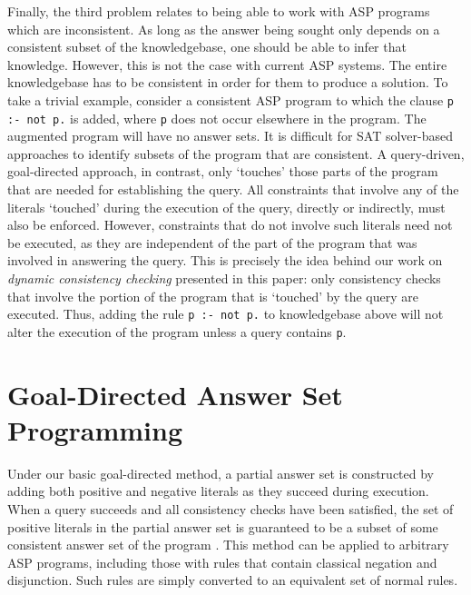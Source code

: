 \documentclass{new_tlp}
\begin{document}
Finally, the third problem relates to being able to work with ASP programs 
which are inconsistent. As long as the answer being sought only 
depends on a consistent subset of the knowledgebase, one should be able to 
infer that knowledge. However, this is not the case with current ASP systems. 
The entire knowledgebase has to be consistent in order for them to produce a 
solution. To take a trivial example, consider a consistent ASP program 
 to which the clause {\tt p :- not p.} 
is added, where {\tt p} does not occur elsewhere in the program. The augmented 
program will have no answer sets. It is difficult for 
SAT solver-based approaches to identify subsets of the program that are 
consistent. A query-driven, goal-directed approach, in contrast, only `touches'
those parts of the program that are needed for establishing the query. All
constraints that involve any of the literals `touched' during the execution of 
the query, directly or indirectly, must also be enforced. However, constraints 
that do not involve such literals need not be executed, as they are independent
of the part of the program that was involved in answering the query. This is
precisely the idea behind our work on {\it dynamic consistency checking}
presented in this paper: only consistency checks that involve the portion of
the program that is `touched' by the query are executed. Thus, adding the rule
{\tt p :- not p.} to knowledgebase  above will not alter the execution
of the program unless a query contains \texttt{p}.


\section{Goal-Directed Answer Set Programming} \label{sec:goaldir}

Under our basic goal-directed method, a partial answer set is constructed by 
adding both positive and negative literals as they succeed during execution. 
When a query succeeds and all consistency checks have been satisfied, the set 
of positive literals in the partial answer set is guaranteed to be a subset of 
some consistent answer set of the program \cite{goalasp}. This method can be 
applied to arbitrary ASP programs, including those with rules that contain 
classical negation and disjunction. Such rules are simply converted to an 
equivalent set of normal rules.
\end{document}
